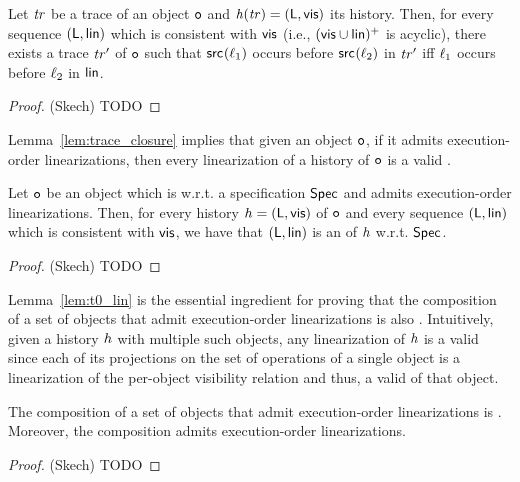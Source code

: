 \begin{lemma}\label{lem:trace_closure}
Let $\mathit{tr}$ be a trace of an object $\mathtt{o}$ and $\mathit{h}({\mathit{tr})}=(\mathsf{L},\mathsf{vis})$ its history. Then, for every sequence $(\mathsf{L},\mathsf{lin})$ which is consistent with $\mathsf{vis}$ (i.e., $(\mathsf{vis}
    \cup \mathsf{lin})^{+}$ is acyclic), there exists a trace $\mathit{tr}'$ of $\mathtt{o}$ such that $\mathsf{src}_{}(\ell_1)$ occurs before $\mathsf{src}_{}(\ell_2)$ in $\mathit{tr}'$ iff $\ell_1$ occurs before $\ell_2$ in $\mathsf{lin}$.
\end{lemma}
\begin{proof}(Skech)
TODO
\end{proof}

Lemma~\ref{lem:trace_closure} implies that given an \crdtlinearizable{} object $\mathtt{o}$, if it admits execution-order linearizations, then every linearization of a history of $\mathtt{o}$ is a valid \crdtlinearization{}.

\begin{lemma}\label{lem:t0_lin}
Let $\mathtt{o}$ be an object which is \crdtlinearizable{} w.r.t. a specification $\mathsf{Spec}$ and admits execution-order linearizations. Then, for every history ${h}=(\mathsf{L},\mathsf{vis})$ of $\mathtt{o}$ and every sequence $(\mathsf{L},\mathsf{lin})$ which is consistent with $\mathsf{vis}$, we have that $(\mathsf{L},\mathsf{lin})$ is an \crdtlinearization{} of ${h}$ w.r.t. $\mathsf{Spec}$.
\end{lemma}
\begin{proof}(Skech)
TODO
\end{proof}

Lemma~\ref{lem:t0_lin} is the essential ingredient for proving that the composition of a set of \crdtlinearizable{} objects that admit execution-order linearizations is also \crdtlinearizable{}. Intuitively, given a history ${h}$ with multiple such objects, any linearization of ${h}$ is a valid \crdtlinearization{} since each of its projections on the set of operations of a single object is a linearization of the per-object visibility relation and thus, a valid \crdtlinearization{} of that object.

\begin{theorem}\label{th:t0}
The composition of a set of \crdtlinearizable{} objects that admit execution-order linearizations is \crdtlinearizable{}. Moreover, the composition admits execution-order linearizations.
\end{theorem}
\begin{proof}(Skech)
TODO
\end{proof}

